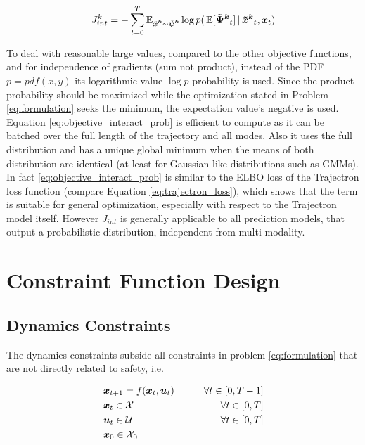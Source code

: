\begin{equation}
J_{int}^k = - \sum_{t=0}^T \mathbb{E}_{\xped[k] \sim \dist[k]} \log p(\, \mathbb{E}[\distwo[k]_t] \, | \, \xped[k]_t, \x_t)
\label{eq:objective_interact_prob}
\end{equation}

To deal with reasonable large values, compared to the other objective functions, and for independence of gradients (sum not product), instead of the \ac{PDF} $p = pdf(x, y)$ its logarithmic value $\log p$ probability is used. Since the product probability should be maximized while the optimization stated in Problem \ref{eq:formulation} seeks the minimum, the expectation value's negative is used.
\newline
Equation \ref{eq:objective_interact_prob} is efficient to compute as it can be batched over the full length of the trajectory and all modes. Also it uses the full distribution and has a unique global minimum when the means of both distribution are identical (at least for Gaussian-like distributions such as \ac{GMM}s). In fact \ref{eq:objective_interact_prob} is similar to the \ac{ELBO} loss of the Trajectron loss function (compare Equation \ref{eq:trajectron_loss}), which shows that the term is suitable for general optimization, especially with respect to the Trajectron model itself. However $J_{int}$ is generally applicable to all prediction models, that output a probabilistic distribution, independent from multi-modality.


\section{Constraint Function Design}
\label{text:approach/constraint}

\subsection{Dynamics Constraints}
\label{text:approach/constraint/dynamics}
The dynamics constraints subside all constraints in problem \ref{eq:formulation} that are not directly related to safety, i.e. 

\begin{align}
\label{eq:constraint_f}
&\boldsymbol{x}_{t+1} = f(\boldsymbol{x}_t, \boldsymbol{u}_t) \qquad& \forall t \in [0, T - 1] \\
\label{eq:constraint_x}
&\boldsymbol{x}_t \in \mathcal{X} & \forall t \in [0, T]\\
\label{eq:constraint_u}
&\boldsymbol{u}_t \in \mathcal{U} & \forall t \in [0, T]\\
\label{eq:constraint_x0}
&\boldsymbol{x}_0 \in \mathcal{X}_0
\end{align}

